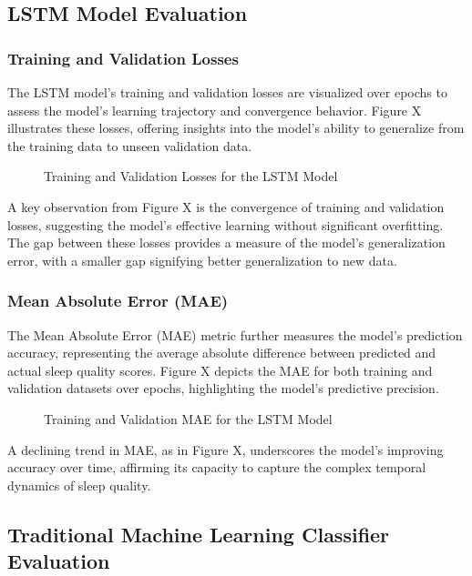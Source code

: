 \documentclass[10pt]{extarticle}
\begin{document}
\subsection{LSTM Model Evaluation}

\subsubsection{Training and Validation Losses}

The LSTM model's training and validation losses are visualized over epochs to assess the model's learning trajectory and convergence behavior. Figure X illustrates these losses, offering insights into the model's ability to generalize from the training data to unseen validation data.

\begin{figure}[H]
    \centering
    \caption{Training and Validation Losses for the LSTM Model}
\end{figure}

A key observation from Figure X is the convergence of training and validation losses, suggesting the model's effective learning without significant overfitting. The gap between these losses provides a measure of the model's generalization error, with a smaller gap signifying better generalization to new data.

\subsubsection{Mean Absolute Error (MAE)}

The Mean Absolute Error (MAE) metric further measures the model's prediction accuracy, representing the average absolute difference between predicted and actual sleep quality scores. Figure X depicts the MAE for both training and validation datasets over epochs, highlighting the model's predictive precision.

\begin{figure}[H]
    \centering
    \caption{Training and Validation MAE for the LSTM Model}
\end{figure}

A declining trend in MAE, as in Figure X, underscores the model's improving accuracy over time, affirming its capacity to capture the complex temporal dynamics of sleep quality.

\subsection{Traditional Machine Learning Classifier Evaluation}
\end{document}
